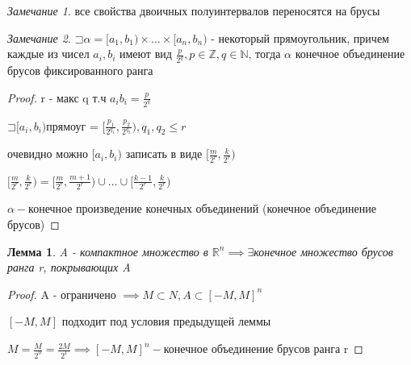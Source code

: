 \documentclass[a4paper]{article}
\newcommand\letsymbol{\mathord{\sqsupset}}
\newtheorem{lemma}{Лемма}[section]
\theoremstyle{definition}
\theoremstyle{remark}
\newtheorem*{remark}{Замечание}
\begin{document}
     \begin{remark}
          все свойства двоичных полуинтервалов переносятся на брусы
     \end{remark}
     \begin{remark}
          $\letsymbol{}\alpha = [a_1, b_1)\times\dots\times[a_n, b_n)$ - некоторый прямоугольник, причем каждые из чисел $a_i, b_i$ имеют вид $\frac{p}{2^q}, p\in\mathbb{Z}, q\in\mathbb{N}$, тогда
          $\alpha$ конечное объединение брусов фиксированного ранга
     \end{remark}
          \begin{proof}
               r - макс q т.ч $a_ib_i = \frac{p}{2^q}$

               $\letsymbol[a_i, b_i)$прямоуг = $[\frac{p_1}{2^{q_1}}, \frac{p_2}{2^{q_2}}), q_1, q_2\leq r$

               очевидно можно $[a_i, b_i)$ записать в виде $[\frac{m}{2^r}, \frac{k}{2^r})$

               $[\frac{m}{2^r}, \frac{k}{2^r}) = [\frac{m}{2^r}, \frac{m+1}{2^r})\cup\dots\cup[\frac{k-1}{2^r}, \frac{k}{2^r})$

               $\alpha - $конечное произведение конечных объединений (конечное объединение брусов)
          \end{proof}
          \begin{lemma}
               A - компактное множество в $\mathbb{R}^n\implies\exists$конечное множество брусов ранга r, покрывающих A
          
          \end{lemma}
          \begin{proof}
               A -  ограничено $\implies M\subset N, A\subset [-M, M]^n$
          
               $[-M, M]$ подходит под условия предыдущей леммы
          
               $M = \frac{M}{2^0} = \frac{2M}{2^1}\implies [-M, M]^n - $конечное объединение брусов
               ранга r
          \end{proof}
\end{document}

